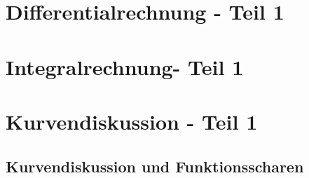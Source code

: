 \documentclass[../Mathe_Aufgaben.tex]{subfiles}
\begin{document}
	\chapter{Differentialrechnung - Teil 1}
	\chapter{Integralrechnung- Teil 1}
	\chapter{Kurvendiskussion - Teil 1}

	\section{Kurvendiskussion und Funktionsscharen}
	\label{sec:aufg-kurve1}
\end{document}
